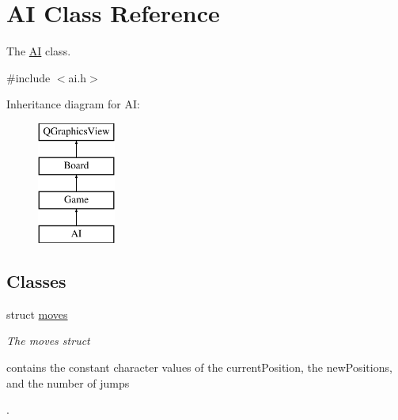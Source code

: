 \hypertarget{class_a_i}{\section{A\-I Class Reference}
\label{class_a_i}
}


The \hyperlink{class_a_i}{A\-I} class.  




{\ttfamily \#include $<$ai.\-h$>$}

Inheritance diagram for A\-I\-:\begin{figure}[H]
\begin{center}
\leavevmode
\includegraphics[height=4.000000cm]{class_a_i}
\end{center}
\end{figure}
\subsection*{Classes}
\begin{DoxyCompactItemize}
\item 
struct \hyperlink{struct_a_i_1_1moves}{moves}
\begin{DoxyCompactList}\small\item\em The moves struct \begin{DoxyVerb} contains the constant character values of the currentPosition, the newPositions, and the number of jumps\end{DoxyVerb}
. \end{DoxyCompactList}\end{DoxyCompactItemize}
